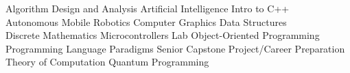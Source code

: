 \documentclass[
    10pt,
    A4,
    english,
    draft = false,
    twoside = false,
]{article}
\begin{document}
        {

        \vspace{-10pt}
        {
          Algorithm Design and Analysis \cvContactSpace Artificial Intelligence \cvContactSpace Intro to C++ \\ Autonomous Mobile Robotics \cvContactSpace Computer Graphics \cvContactSpace Data Structures \\ Discrete Mathematics \cvContactSpace Microcontrollers Lab \cvContactSpace  Object-Oriented Programming \\ Programming Language Paradigms \cvContactSpace Senior Capstone Project/Career Preparation \\ Theory of Computation \cvContactSpace Quantum Programming
        }

        
        
}
\end{document}
